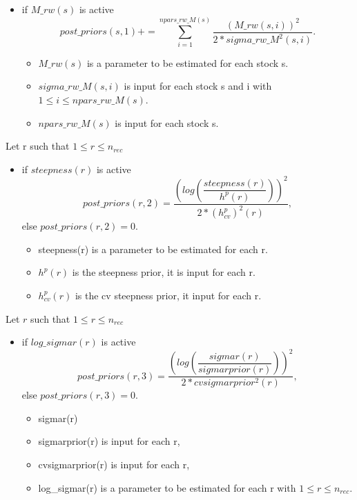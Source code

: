 \documentclass{article}
\begin{document}
    \begin{itemize}
        \item if $M\_rw(s)$ is active
        \begin{equation}
             post\_priors(s,1) 
 +=  \sum_{i=1}^{npars\_rw\_M(s)}\dfrac{(M\_rw(s,i))^2}{2*sigma\_rw\_M^2(s,i)}.
        \end{equation}
        \begin{itemize}
            \item $M\_rw(s)$ is a parameter to be estimated for each stock s. 
            \item $sigma\_rw\_M(s,i)$ is input for each stock s and i with $1\leq i \leq npars\_rw\_M(s)$.
            \item $npars\_rw\_M(s)$ is input for each stock s.
        \end{itemize}
    \end{itemize}
    Let r such that $1\leq r \leq n_{rec}$
    \begin{itemize}
        \item if $steepness(r)$ is active
        \begin{equation}
            post\_priors(r,2) = \dfrac{\left(log\left(\dfrac{steepness(r)}{h^p(r)}\right)\right)^2}{2*(h^p_{cv})^2(r)},
        \end{equation}
        else $post\_priors(r,2)=0$.
        \begin{itemize}
            \item steepness(r) is a parameter to be estimated for each r. 
            \item $h^p(r)$ is the steepness prior, it is input for each r. 
            \item $h^p_{cv}(r)$ is the cv steepness prior, it input for each r. 
        \end{itemize}
    \end{itemize}
    Let $r$ such that $1\leq r \leq n_{rec}$
    \begin{itemize}
        \item if $log\_sigmar(r)$ is active
        \begin{equation}
            post\_priors(r,3) = \dfrac{\left(log\left(\dfrac{sigmar(r)}{sigmarprior(r)}\right)\right)^2}{2*cvsigmarprior^2(r)},
        \end{equation}
        else $post\_priors(r,3)=0$.
        \begin{itemize}
            \item sigmar(r)
            \item sigmarprior(r) is input for each r,
            \item cvsigmarprior(r) is input for each r,
            \item log\_sigmar(r) is a parameter to be estimated for each r with $1\leq r \leq n_{rec}$.
        \end{itemize}
    \end{itemize}
\end{document}
